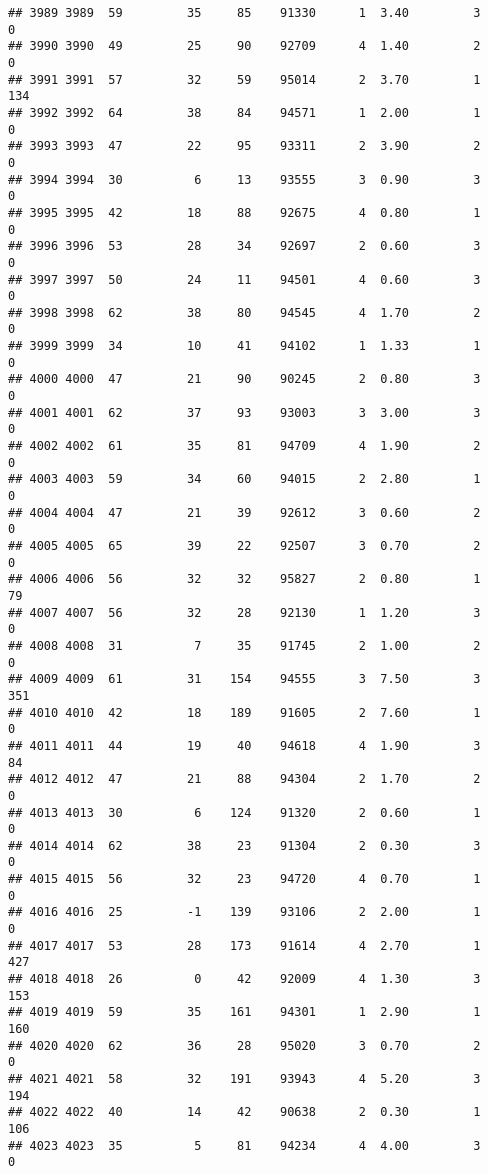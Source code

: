 \documentclass[
]{article}
\begin{document}
\begin{verbatim}
## 3989 3989  59         35     85    91330      1  3.40         3        0
## 3990 3990  49         25     90    92709      4  1.40         2        0
## 3991 3991  57         32     59    95014      2  3.70         1      134
## 3992 3992  64         38     84    94571      1  2.00         1        0
## 3993 3993  47         22     95    93311      2  3.90         2        0
## 3994 3994  30          6     13    93555      3  0.90         3        0
## 3995 3995  42         18     88    92675      4  0.80         1        0
## 3996 3996  53         28     34    92697      2  0.60         3        0
## 3997 3997  50         24     11    94501      4  0.60         3        0
## 3998 3998  62         38     80    94545      4  1.70         2        0
## 3999 3999  34         10     41    94102      1  1.33         1        0
## 4000 4000  47         21     90    90245      2  0.80         3        0
## 4001 4001  62         37     93    93003      3  3.00         3        0
## 4002 4002  61         35     81    94709      4  1.90         2        0
## 4003 4003  59         34     60    94015      2  2.80         1        0
## 4004 4004  47         21     39    92612      3  0.60         2        0
## 4005 4005  65         39     22    92507      3  0.70         2        0
## 4006 4006  56         32     32    95827      2  0.80         1       79
## 4007 4007  56         32     28    92130      1  1.20         3        0
## 4008 4008  31          7     35    91745      2  1.00         2        0
## 4009 4009  61         31    154    94555      3  7.50         3      351
## 4010 4010  42         18    189    91605      2  7.60         1        0
## 4011 4011  44         19     40    94618      4  1.90         3       84
## 4012 4012  47         21     88    94304      2  1.70         2        0
## 4013 4013  30          6    124    91320      2  0.60         1        0
## 4014 4014  62         38     23    91304      2  0.30         3        0
## 4015 4015  56         32     23    94720      4  0.70         1        0
## 4016 4016  25         -1    139    93106      2  2.00         1        0
## 4017 4017  53         28    173    91614      4  2.70         1      427
## 4018 4018  26          0     42    92009      4  1.30         3      153
## 4019 4019  59         35    161    94301      1  2.90         1      160
## 4020 4020  62         36     28    95020      3  0.70         2        0
## 4021 4021  58         32    191    93943      4  5.20         3      194
## 4022 4022  40         14     42    90638      2  0.30         1      106
## 4023 4023  35          5     81    94234      4  4.00         3        0

\end{verbatim}
\end{document}
